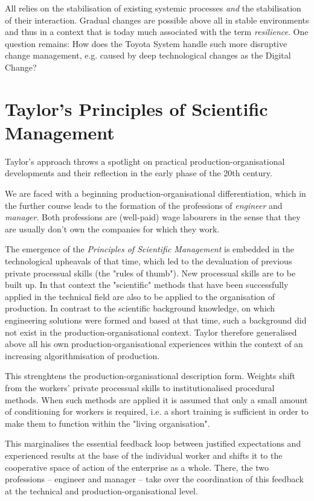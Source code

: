 \documentclass[11pt,a4paper]{article}
\begin{document}
All relies on the stabilisation of existing systemic processes \emph{and} the
stabilisation of their interaction. Gradual changes are possible above all in
stable environments and thus in a context that is today much associated with
the term \emph{resilience}. One question remains: How does the Toyota System
handle such more disruptive change management, e.g. caused by deep
technological changes as the Digital Change?

\section{Taylor's Principles of Scientific Management}

Taylor's approach throws a spotlight on practical production-organisational
developments and their reflection in the early phase of the 20th century.

We are faced with a beginning production-organisational differentiation, which
in the further course leads to the formation of the professions of
\emph{engineer} and \emph{manager}. Both professions are (well-paid) wage
labourers in the sense that they are usually don't own the companies for which
they work.

The emergence of the \emph{Principles of Scientific Management} is embedded in
the technological upheavals of that time, which led to the devaluation of
previous private processual skills (the "rules of thumb"). New processual
skills are to be built up. In that context the "scientific" methods that have
been successfully applied in the technical field are also to be applied to the
organisation of production. In contrast to the scientific background
knowledge, on which engineering solutions were formed and based at that time,
such a background did not exist in the production-organisational context.
Taylor therefore generalised above all his own production-organisational
experiences within the context of an increasing algorithmisation of
production.

This strenghtens the production-organisational description form. Weights shift
from the workers' private processual skills to institutionalised procedural
methods. When such methods are applied it is assumed that only a small amount
of conditioning for workers is required, i.e. a short training is sufficient
in order to make them to function within the "living organisation".

This marginalises the essential feedback loop between justified expectations
and experienced results at the base of the individual worker and shifts it to
the cooperative space of action of the enterprise as a whole. There, the two
professions -- engineer and manager -- take over the coordination of this
feedback at the technical and production-organisational level.
\end{document}
